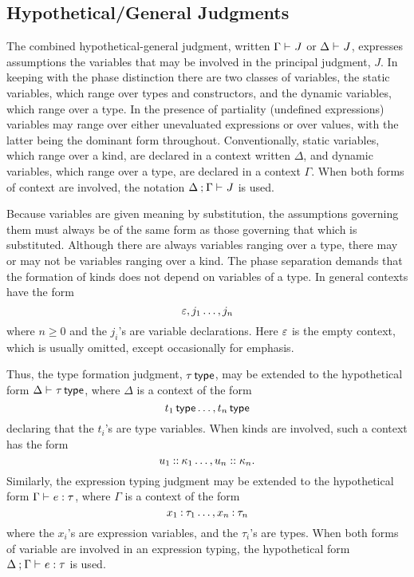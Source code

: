 \documentclass[11pt]{article}
\begin{document}
\subsection*{Hypothetical/General Judgments}

The combined hypothetical-general judgment, written $\Gamma\entails J$ or $\Delta\entails J$, expresses assumptions the variables that may be involved in the principal judgment, $J$.  In keeping with the phase distinction there are two classes of variables, the static variables, which range over types and constructors, and the dynamic variables, which range over a type.  In the presence of partiality (undefined expressions) variables may range over either unevaluated expressions or over values, with the latter being the dominant form throughout.  Conventionally, static variables, which range over a kind, are declared in a context written $\Delta$, and dynamic variables, which range over a type, are declared in a context $\Gamma$.  When both forms of context are involved, the notation $\sepCtx{\Delta}{\Gamma}\entails J$ is used.

Because variables are given meaning by substitution, the assumptions governing them must always be of the same form as those governing that which is substituted.  Although there are always variables ranging over a type, there may or may not be variables ranging over a kind.  The phase separation demands that the formation of kinds does not depend on variables of a type.  In general contexts have the form
\[
    \varepsilon,j_1\dots,j_n
\]
where $n\geq 0$ and the $j_i$'s are variable declarations.  Here $\varepsilon$ is the empty context, which is usually omitted, except occasionally for emphasis.

Thus, the type formation judgment, $\tau\,\textsf{type}$, may be extended to the hypothetical form $\Delta\entails\isTp{\tau}$, where $\Delta$ is a context of the form
\[
    t_1\,\textsf{type}\dots,t_n\,\textsf{type}
\]
declaring that the $t_i$'s are type variables.  When kinds are involved, such a context has the form
\[
    \extCtx{\isOfKd*{u_1}{\kappa_1}\dots}{\isOfKd{u_n}{\kappa_n}}.
\]
Similarly, the expression typing judgment may be extended to the hypothetical form $\Gamma\entails \isOf{e}{\tau}$, where $\Gamma$ is a context of the form
\[
    \extCtx{\isOf*{x_1}{\tau_1}\dots}{\isOf*{x_n}{\tau_n}}
\]
where the $x_i$'s are expression variables, and the $\tau_i$'s are types.  When both forms of variable are involved in an expression typing, the hypothetical form $\sepCtx{\Delta}{\Gamma}\entails \isOf{e}{\tau}$ is used.
\end{document}
